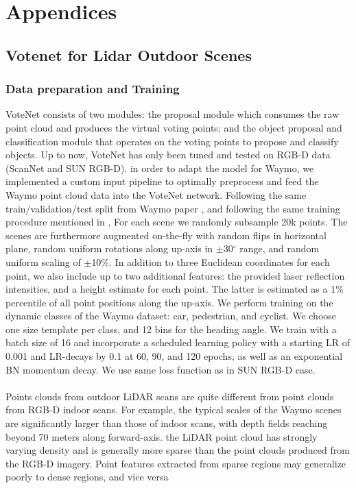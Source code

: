 \documentclass[10pt,twocolumn,letterpaper]{article}
\begin{document}
{\small


}


\appendix
\section*{Appendices}
\renewcommand{\thesubsection}{\Alph{subsection}}

\subsection{Votenet for Lidar Outdoor Scenes}\label{appendix:votenet}

\subsubsection {Data preparation and Training}
VoteNet consists of two modules: the proposal module which consumes the raw point cloud and produces the virtual voting points; and the object proposal and classification module that operates on the voting points to propose and classify objects. Up to now, VoteNet has only been tuned and tested on RGB-D data (ScanNet and SUN RGB-D). in order to adapt the model for Waymo, we implemented a custom input pipeline to optimally preprocess and feed the Waymo point cloud data into the VoteNet network.
Following the same train/validation/test split from Waymo paper \cite{sun2020scalability}, and following the same training procedure mentioned in \cite{qi2019deep}, For each scene we randomly subsample 20k points. The scenes are furthermore augmented on-the-fly with random flips in horizontal plane, random uniform rotations along up-axis in  $\pm$30$^{\circ}$ range, and random uniform scaling of $\pm$10\%. In addition to three Euclidean coordinates for each point, we also include up to two additional features: the provided laser reflection intensities, and a height estimate for each point. The latter is estimated as a 1\% percentile of all point positions along the up-axis.
We perform training on the dynamic classes of the Waymo dataset: car, pedestrian, and cyclist. We choose one size template per class, and 12 bins for the heading angle. We train with a batch size of 16 and incorporate a scheduled learning policy with a starting LR of 0.001 and LR-decays by 0.1 at 60, 90, and 120 epochs, as well as an exponential BN momentum decay. We use same loss function as in SUN RGB-D case.
\paragraph{}
Points clouds from outdoor LiDAR scans are quite different from point clouds from RGB-D indoor scans. For example, the typical scales of the Waymo scenes are significantly larger than those of indoor scans, with depth fields reaching beyond 70 meters along forward-axis. the LiDAR point cloud has strongly varying density and is generally more sparse than the point clouds produced from the RGB-D imagery. Point features extracted from sparse regions may generalize poorly to dense regions, and vice versa
\end{document}

